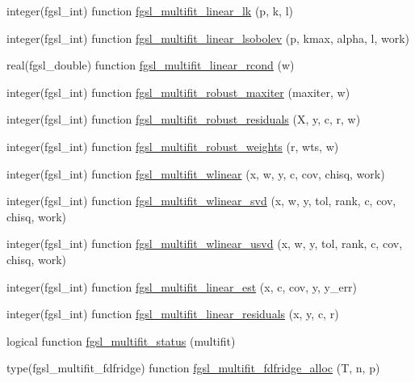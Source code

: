 \begin{DoxyCompactItemize}
integer(fgsl\+\_\+int) function \hyperlink{multifit_8finc_a0a266c4fbbdb1ec912dd9eb7a00fa235}{fgsl\+\_\+multifit\+\_\+linear\+\_\+lk} (p, k, l)
\item 
integer(fgsl\+\_\+int) function \hyperlink{multifit_8finc_aad287986bf310c5af76aaddd10dd64be}{fgsl\+\_\+multifit\+\_\+linear\+\_\+lsobolev} (p, kmax, alpha, l, work)
\item 
real(fgsl\+\_\+double) function \hyperlink{multifit_8finc_a9279bbf6cb0464cb17199ca61ed4610f}{fgsl\+\_\+multifit\+\_\+linear\+\_\+rcond} (w)
\item 
integer(fgsl\+\_\+int) function \hyperlink{multifit_8finc_a3011471a7916320b0bd4d34c6a17f293}{fgsl\+\_\+multifit\+\_\+robust\+\_\+maxiter} (maxiter, w)
\item 
integer(fgsl\+\_\+int) function \hyperlink{multifit_8finc_aef0315d4701dbc6204a8b87ccf9a7a66}{fgsl\+\_\+multifit\+\_\+robust\+\_\+residuals} (X, y, c, r, w)
\item 
integer(fgsl\+\_\+int) function \hyperlink{multifit_8finc_a38a8512d577cbe1a78d9c7f65c4d1147}{fgsl\+\_\+multifit\+\_\+robust\+\_\+weights} (r, wts, w)
\item 
integer(fgsl\+\_\+int) function \hyperlink{multifit_8finc_aca3c885bfd73f86607f2dd5a818dda56}{fgsl\+\_\+multifit\+\_\+wlinear} (x, w, y, c, cov, chisq, work)
\item 
integer(fgsl\+\_\+int) function \hyperlink{multifit_8finc_a0e7bfa86f1948b97bdc540a44d370f1b}{fgsl\+\_\+multifit\+\_\+wlinear\+\_\+svd} (x, w, y, tol, rank, c, cov, chisq, work)
\item 
integer(fgsl\+\_\+int) function \hyperlink{multifit_8finc_a7b805f25c1bfc343d95b2183238bfb3d}{fgsl\+\_\+multifit\+\_\+wlinear\+\_\+usvd} (x, w, y, tol, rank, c, cov, chisq, work)
\item 
integer(fgsl\+\_\+int) function \hyperlink{multifit_8finc_a190c5d107367d5f9039e81905cfc85f7}{fgsl\+\_\+multifit\+\_\+linear\+\_\+est} (x, c, cov, y, y\+\_\+err)
\item 
integer(fgsl\+\_\+int) function \hyperlink{multifit_8finc_a6f9df5f586bf1ea89402f34d33633b97}{fgsl\+\_\+multifit\+\_\+linear\+\_\+residuals} (x, y, c, r)
\item 
logical function \hyperlink{multifit_8finc_add0b89e45ce90eb1a9117d3e45e6b39e}{fgsl\+\_\+multifit\+\_\+status} (multifit)
\item 
type(fgsl\+\_\+multifit\+\_\+fdfridge) function \hyperlink{multifit_8finc_a6d12ecdf3ced9afc48c46b0250df4514}{fgsl\+\_\+multifit\+\_\+fdfridge\+\_\+alloc} (T, n, p)
\item 

\end{DoxyCompactItemize}
